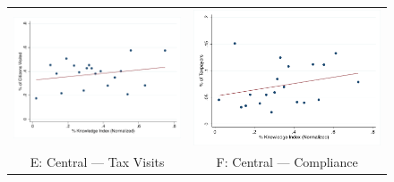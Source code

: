 \documentclass[12pt,english]{article}
\begin{document}
\begin{figure}[H]
\begin{tabular}{cc}
\includegraphics[scale=0.5]{Output/visits_chefknowindex_CwI_binned.pdf} & \includegraphics[scale=0.5]{Output/taxes_paid_chefknowindex_CwI_binned.pdf}\\
E: Central --- Tax Visits & F:  Central --- Compliance    \\

\end{tabular}
\end{figure}
\end{document}
